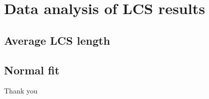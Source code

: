 \documentclass{beamer}
\begin{document}
\section{Data analysis of LCS results}
\subsection{Average LCS length}
\subsection{Normal fit}

\begin{frame}

\end{frame}

\begin{frame}[standout]
  Thank you
\end{frame}
\end{document}
